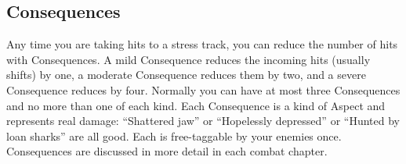 \subsection{Consequences}\label{sec:Consequences} %

Any time you are taking hits to a stress track, you can reduce the number of hits with Consequences. A mild Consequence reduces the incoming hits (usually shifts) by one, a moderate Consequence reduces them by two, and a severe Consequence reduces by four. Normally you can have at most three Consequences and no more than one of each kind. Each Consequence is a kind of Aspect and represents real damage: ``Shattered jaw'' or ``Hopelessly depressed'' or ``Hunted by loan sharks'' are all good. Each is free-taggable by your enemies once. Consequences are discussed in more detail in each combat chapter.

